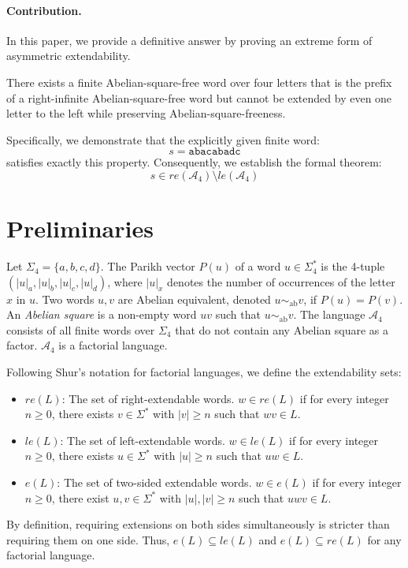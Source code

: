 \documentclass[12pt]{article}
\begin{document}
\paragraph{Contribution.} In this paper, we provide a definitive answer by proving an extreme form of asymmetric extendability. 

There exists a finite Abelian-square-free word over four letters that is the prefix of a right-infinite Abelian-square-free word but cannot be extended by even one letter to the left while preserving Abelian-square-freeness.

Specifically, we demonstrate that the explicitly given finite word:
$$s = \texttt{abacabadc}$$
satisfies exactly this property. Consequently, we establish the formal theorem:
$$s \in re(\mathcal{A}_4) \setminus le(\mathcal{A}_4)$$


\section{Preliminaries}
Let $\Sigma_4 = \{a,b,c,d\}$. The Parikh vector $P(u)$ of a word $u \in \Sigma_4^*$ is the 4-tuple $(|u|_a, |u|_b, |u|_c, |u|_d)$, where $|u|_x$ denotes the number of occurrences of the letter $x$ in $u$. 
Two words $u, v$ are Abelian equivalent, denoted $u \sim_{\mathrm{ab}} v$, if $P(u) = P(v)$. 
An \textit{Abelian square} is a non-empty word $uv$ such that $u \sim_{\mathrm{ab}} v$. 
The language $\mathcal{A}_4$ consists of all finite words over $\Sigma_4$ that do not contain any Abelian square as a factor. $\mathcal{A}_4$ is a factorial language.

Following Shur's notation for factorial languages, we define the extendability sets:
\begin{itemize}
    \item \textbf{$re(L)$}: The set of right-extendable words. $w \in re(L)$ if for every integer $n \ge 0$, there exists $v \in \Sigma^*$ with $|v| \ge n$ such that $wv \in L$.
    \item \textbf{$le(L)$}: The set of left-extendable words. $w \in le(L)$ if for every integer $n \ge 0$, there exists $u \in \Sigma^*$ with $|u| \ge n$ such that $uw \in L$.
    \item \textbf{$e(L)$}: The set of two-sided extendable words. $w \in e(L)$ if for every integer $n \ge 0$, there exist $u, v \in \Sigma^*$ with $|u|, |v| \ge n$ such that $uwv \in L$.
\end{itemize}

By definition, requiring extensions on both sides simultaneously is stricter than requiring them on one side. Thus, $e(L) \subseteq le(L)$ and $e(L) \subseteq re(L)$ for any factorial language.
\end{document}
